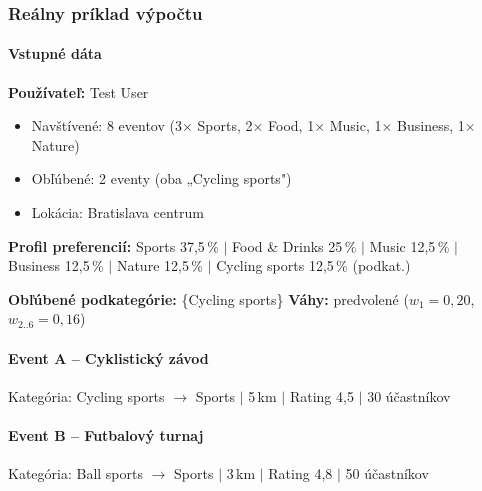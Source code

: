   \subsubsection{Reálny príklad výpočtu}

  \paragraph{Vstupné dáta}

  \textbf{Používateľ:} Test User
  \begin{itemize}
      \item Navštívené: 8 eventov (3× Sports, 2× Food, 1× Music, 1× Business, 1× Nature)
      \item Obľúbené: 2 eventy (oba „Cycling sports")
      \item Lokácia: Bratislava centrum
  \end{itemize}

  \textbf{Profil preferencií:}
  Sports 37,5\,\% $|$ Food \& Drinks 25\,\% $|$ Music 12,5\,\% $|$                                                                                                                                                                  
  Business 12,5\,\% $|$ Nature 12,5\,\% $|$ Cycling sports 12,5\,\% (podkat.)

  \textbf{Obľúbené podkategórie:} \{Cycling sports\} \quad                                                                                                                                                                          
  \textbf{Váhy:} predvolené ($w_1{=}0{,}20$, $w_{2..6}{=}0{,}16$)

  \paragraph{Event A -- Cyklistický závod}
  Kategória: Cycling sports $\rightarrow$ Sports $|$ 5\,km $|$ Rating 4,5 $|$ 30 účastníkov

  \paragraph{Event B -- Futbalový turnaj}
  Kategória: Ball sports $\rightarrow$ Sports $|$ 3\,km $|$ Rating 4,8 $|$ 50 účastníkov

